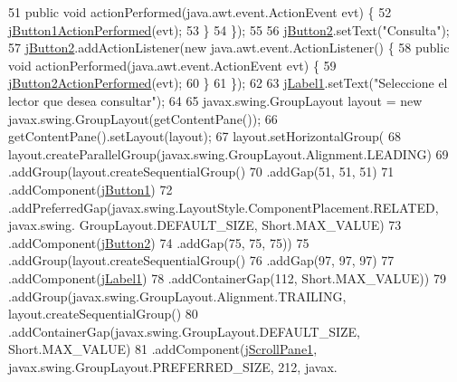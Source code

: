 \begin{DoxyCode}
51             \textcolor{keyword}{public} \textcolor{keywordtype}{void} actionPerformed(java.awt.event.ActionEvent evt) \{
52                 \mbox{\hyperlink{class_interfaz_package_1_1_consulta_lista_lectores_aa12d9387e1fcdb4bacd13a7d3471f709}{jButton1ActionPerformed}}(evt);
53             \}
54         \});
55 
56         \mbox{\hyperlink{class_interfaz_package_1_1_consulta_lista_lectores_a7f8eecc27df6bdc9fc291b6e6c83dc61}{jButton2}}.setText(\textcolor{stringliteral}{"Consulta"});
57         \mbox{\hyperlink{class_interfaz_package_1_1_consulta_lista_lectores_a7f8eecc27df6bdc9fc291b6e6c83dc61}{jButton2}}.addActionListener(\textcolor{keyword}{new} java.awt.event.ActionListener() \{
58             \textcolor{keyword}{public} \textcolor{keywordtype}{void} actionPerformed(java.awt.event.ActionEvent evt) \{
59                 \mbox{\hyperlink{class_interfaz_package_1_1_consulta_lista_lectores_ac0dc90c31a97f36fc10ea54c3d0c6a55}{jButton2ActionPerformed}}(evt);
60             \}
61         \});
62 
63         \mbox{\hyperlink{class_interfaz_package_1_1_consulta_lista_lectores_a527df4a58dc048d5d173177fa32f0764}{jLabel1}}.setText(\textcolor{stringliteral}{"Seleccione el lector que desea consultar"});
64 
65         javax.swing.GroupLayout layout = \textcolor{keyword}{new} javax.swing.GroupLayout(getContentPane());
66         getContentPane().setLayout(layout);
67         layout.setHorizontalGroup(
68             layout.createParallelGroup(javax.swing.GroupLayout.Alignment.LEADING)
69             .addGroup(layout.createSequentialGroup()
70                 .addGap(51, 51, 51)
71                 .addComponent(\mbox{\hyperlink{class_interfaz_package_1_1_consulta_lista_lectores_a682904c76af705735a4b6c2b4ae04c86}{jButton1}})
72                 .addPreferredGap(javax.swing.LayoutStyle.ComponentPlacement.RELATED, javax.swing.
      GroupLayout.DEFAULT\_SIZE, Short.MAX\_VALUE)
73                 .addComponent(\mbox{\hyperlink{class_interfaz_package_1_1_consulta_lista_lectores_a7f8eecc27df6bdc9fc291b6e6c83dc61}{jButton2}})
74                 .addGap(75, 75, 75))
75             .addGroup(layout.createSequentialGroup()
76                 .addGap(97, 97, 97)
77                 .addComponent(\mbox{\hyperlink{class_interfaz_package_1_1_consulta_lista_lectores_a527df4a58dc048d5d173177fa32f0764}{jLabel1}})
78                 .addContainerGap(112, Short.MAX\_VALUE))
79             .addGroup(javax.swing.GroupLayout.Alignment.TRAILING, layout.createSequentialGroup()
80                 .addContainerGap(javax.swing.GroupLayout.DEFAULT\_SIZE, Short.MAX\_VALUE)
81                 .addComponent(\mbox{\hyperlink{class_interfaz_package_1_1_consulta_lista_lectores_a787ac57dc3272376d42c09c0c7f1ef71}{jScrollPane1}}, javax.swing.GroupLayout.PREFERRED\_SIZE, 212, javax.

\end{DoxyCode}
